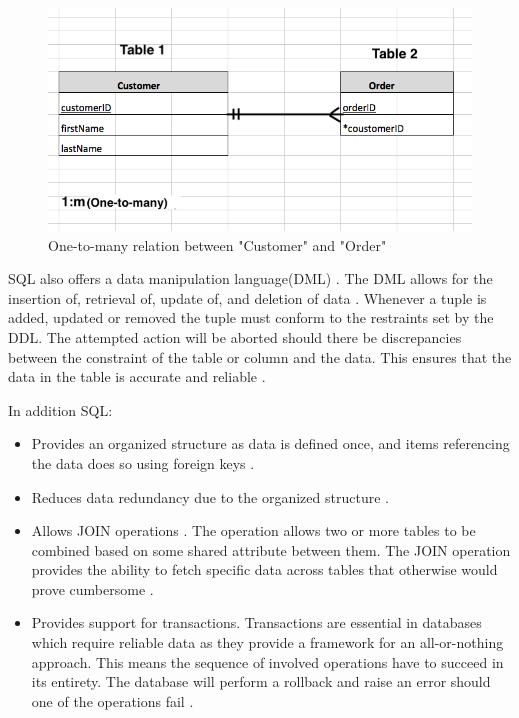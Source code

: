 \begin{figure}
    \centering
    \includegraphics[width=115mm,scale=1]{figures/relational-db-relation.png}
    \caption{One-to-many relation between "Customer" and "Order"}
    \label{fig:relational-db-relation}
\end{figure}

SQL also offers a data manipulation language(DML) \cite{sql-components}.
The DML allows for the insertion of, retrieval of, update of, and deletion of data \cite{sql-dml-options}.
Whenever a tuple is added, updated or removed the tuple must conform to the restraints set by the DDL.
The attempted action will be aborted should there be discrepancies between the constraint of the table or column and the data.
This ensures that the data in the table is accurate and reliable \cite{sql-constraints}.

In addition SQL:
\begin{itemize}
    \item Provides an organized structure as data is defined once, and items referencing the data does so using foreign keys \cite{upwork-sql-adv}.
    \item Reduces data redundancy due to the organized structure \cite{upwork-sql-adv}.
    \item Allows JOIN operations \cite{upwork-sql-adv}.
    The operation allows two or more tables to be combined based on some shared attribute between them.
    The JOIN operation provides the ability to fetch specific data across tables that otherwise would prove cumbersome \cite{sql-joins}.
    \item Provides support for transactions.
    Transactions are essential in databases which require reliable data as they provide a framework for an all-or-nothing approach.
    This means the sequence of involved operations have to succeed in its entirety.
    The database will perform a rollback and raise an error should one of the operations fail \cite{sql-transactions}.
\end{itemize}

